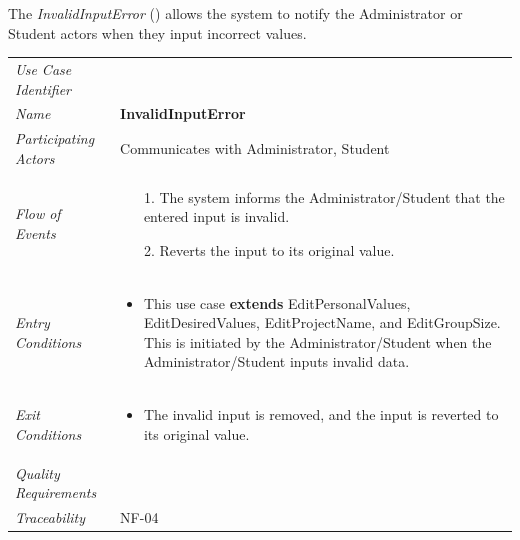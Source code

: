 \documentclass[12pt,letterpaper]{article}
\begin{document}
\newpage{}

The {\it InvalidInputError} ({\bf \invalidinputerror{}}) allows the system to notify the Administrator or Student actors when they input incorrect values.

\begin{center}
	\begin{tabu} to 
		\toprule
		Use Case Identifier & \invalidinputerror{} \\
		Name & {\bf InvalidInputError} \\
		Participating Actors & Communicates with Administrator, Student \\
		Flow of Events & 
		\begin{minipage}[t]{\linewidth}
		    \begin{enumerate}
			    \item[1.] The system informs the Administrator/Student that the entered input is invalid.
			    \item[2.] Reverts the input to its original value.
		  \end{enumerate}
		\end{minipage} \\

		Entry Conditions &
		\begin{minipage}[t]{\linewidth}
			\begin{itemize}
			    \item This use case \textbf{extends} EditPersonalValues, EditDesiredValues, EditProjectName, and EditGroupSize. This is initiated by the Administrator/Student when the Administrator/Student inputs invalid data. 
	        \end{itemize}
		\end{minipage} \\

		Exit Conditions &
		\begin{minipage}[t]{\linewidth}
			\begin{itemize}
			    \item The invalid input is removed, and the input is reverted to its original value.
	        \end{itemize}
		\end{minipage} \\

		Quality Requirements & \\

		Traceability & NF-04 \\
		\toprule
	\end{tabu}
\end{center}
\end{document}
